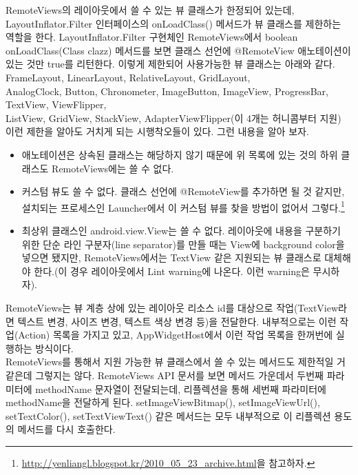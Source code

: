 RemoteViews의 레이아웃에서 쓸 수 있는 뷰 클래스가 한정되어 있는데, LayoutInflator.Filter 인터페이스의  onLoadClass() 메서드가 뷰 클래스를 제한하는 역할을 한다. LayoutInflator.Filter 구현체인 RemoteViews에서 boolean onLoadClass(Class clazz) 메서드를 보면 클래스 선언에 @RemoteView 애노테이션이 있는 것만 true를 리턴한다.
이렇게 제한되어 사용가능한 뷰 클래스는 아래와 같다.\\

FrameLayout, LinearLayout, RelativeLayout, GridLayout,\\
AnalogClock, Button, Chronometer, ImageButton, ImageView, ProgressBar, TextView, ViewFlipper,\\
ListView, GridView, StackView, AdapterViewFlipper(이 4개는 허니콤부터 지원)\\

이런 제한을 알아도 거치게 되는 시행착오들이 있다. 그런 내용을 알아 보자.
\begin{itemize}
\item 애노테이션은 상속된 클래스는 해당하지 않기 때문에 위 목록에 있는 것의 하위 클래스도 RemoteViews에는 쓸 수 없다.
\item 커스텀 뷰도 쓸 수 없다. 클래스 선언에 @RemoteView를 추가하면 될 것 같지만, 설치되는 프로세스인 Launcher에서 이 커스텀 뷰를 찾을 방법이 없어서 그렇다.\footnote{\url{http://yenliangl.blogspot.kr/2010\_05\_23\_archive.html}을 참고하자.}
\item 최상위 클래스인 android.view.View는 쓸 수 없다. 레이아웃에 내용을 구분하기 위한 단순 라인 구분자(line separator)를 만들 때는 View에 background color을 넣으면 됐지만, RemoteViews에서는 TextView 같은 지원되는 뷰 클래스로 대체해야 한다.(이 경우 레이아웃에서 Lint warning에 나온다. 이런 warning은 무시하자).
\end{itemize}

RemoteViews는 뷰 계층 상에 있는 레이아웃 리소스 id를 대상으로 작업(TextView라면 텍스트 변경, 사이즈 변경, 텍스트 색상 변경 등)을 전달한다.
내부적으로는 이런 작업(Action) 목록을 가지고 있고, AppWidgetHost에서 이런 작업 목록을 한꺼번에 실행하는 방식이다.\\

RemoteViews를 통해서 지원 가능한 뷰 클래스에서 쓸 수 있는 메서드도 제한적일 거 같은데 그렇지는 않다. 
RemoteViews API 문서를 보면 메서드 가운데서 두번째 파라미터에 methodName 문자열이 전달되는데, 리플렉션을 통해 세번째 파라미터에 methodName을 전달하게 된다.
setImageViewBitmap(), setImageViewUrl(), setTextColor(), setTextViewText() 같은 메서드는 모두 내부적으로 이 리플렉션 용도의 메서드를 다시 호출한다.\\

